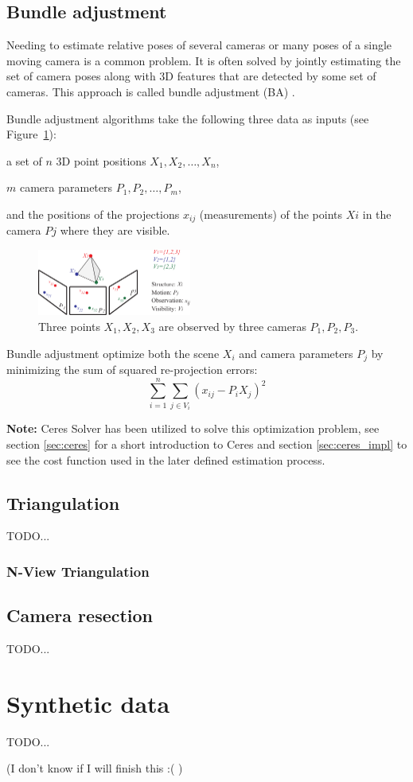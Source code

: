 \subsection{Bundle adjustment}
\label{sec:BA}

Needing to estimate relative poses of several cameras or many poses of a single moving camera is a common problem. It is often solved by jointly estimating the set of camera poses along with 3D features that are detected by some set of cameras. This approach is called bundle adjustment (BA) \cite{BA}.

Bundle adjustment algorithms take the following three data as inputs (see Figure~\ref{fig:BA}):
\begin{itemize*}
 \item a set of $n$ 3D point positions $X_1, X_2, \dots, X_n$,
 \item $m$ camera parameters $P_1, P_2, \dots, P_m$,
 \item and the positions of the projections $x_{ij}$ (measurements) of the points $Xi$ in the camera $Pj$ where they are visible.
\end{itemize*}

\begin{figure}[!htbp]
 \centering
 \includegraphics[width=0.45\textwidth]{images/BA.pdf}
 \caption{Three points $X_1, X_2, X_3$ are observed by three cameras $P_1, P_2, P_3$.}
 \label{fig:BA}
\end{figure}

\noindent
Bundle adjustment optimize both the scene $X_i$ and camera parameters $P_j$ by minimizing the sum of squared re-projection errors:
\[
 \sum _{i=1}^{n}\sum _{j\in V_{i}}\left( x_{ij}-P_{i}X_{j}\right)^2
\]

\noindent
\textbf{Note:} Ceres Solver has been utilized to solve this optimization problem, see section \ref{sec:ceres} for a short introduction to Ceres and section \ref{sec:ceres_impl} to see the cost function used in the later defined estimation process.


\subsection{Triangulation}
\label{sec:triangulation}
TODO...

\subsubsection{N-View Triangulation}
\label{sec:nview_triangulation}


\subsection{Camera resection}
TODO...





\section{Synthetic data}

TODO...

(I don't know if I will finish this :( )
